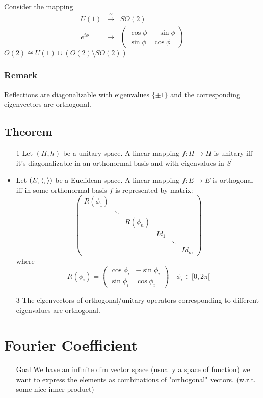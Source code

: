 \documentclass{book}
\newcommand{\leftbracket}{[}
\begin{document}
Consider the mapping$$\begin{aligned}
    U(1) &\stackrel{\cong}\rightarrow&SO(2)\\
    e^{i\phi}&\mapsto&\begin{pmatrix}
        \cos\phi&-\sin\phi\\\sin\phi&\cos\phi
    \end{pmatrix}
\end{aligned}$$
$O(2)\cong U(1)\cup\left(O(2)\setminus SO(2)\right)$
\subsection*{Remark}
Reflections are diagonalizable with eigenvalues $\{\pm 1\}$ and the corresponding eigenvectors are orthogonal.
\section{Theorem}
\begin{itemize}
    \item[1] Let $(H,h)$ be a unitary space. A linear mapping $f:H\rightarrow H$ is unitary iff it's diagonalizable in an orthonormal basis and with eigenvalues in $S^1$
    \item Let $(E,\left<,\right>)$ be a Euclidean space. A linear mapping $f:E\rightarrow E$ is orthogonal iff in some orthonormal basis $f$ is represented by matrix:
    $$\begin{pmatrix}
        R(\phi_1)&&&&&\\
        &\ddots&&&\\
        &&R(\phi_n)&&\\
        &&&Id_1&\\
        &&&&\ddots&\\
        &&&&&Id_m
    \end{pmatrix}$$
    where $$R(\phi_i)=\begin{pmatrix}
        \cos\phi_i&-\sin\phi_i\\\sin\phi_i&\cos\phi_i
    \end{pmatrix}\quad \phi_i\in \leftbracket 0,2\pi\leftbracket$$
    \item[3] The eigenvectors of orthogonal/unitary operators corresponding to different eigenvalues are orthogonal.
\end{itemize}
\chapter{Fourier Coefficient}
\begin{itemize}
    \item[Goal]We have an infinite dim vector space (usually a space of function) we want to express the elements as combinations of "orthogonal" vectors. (w.r.t. some nice inner product)
\end{itemize}
\end{document}
